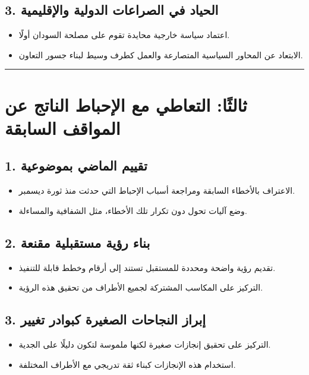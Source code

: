 \documentclass[12pt]{article}
\begin{document}
\subsection{3. الحياد في الصراعات الدولية والإقليمية}
\begin{itemize}
    \item اعتماد سياسة خارجية محايدة تقوم على مصلحة السودان أولًا.
    \item الابتعاد عن المحاور السياسية المتصارعة والعمل كطرف وسيط لبناء جسور التعاون.
\end{itemize}

\hrule

\section{ثالثًا: التعاطي مع الإحباط الناتج عن المواقف السابقة}
\subsection{1. تقييم الماضي بموضوعية}
\begin{itemize}
    \item الاعتراف بالأخطاء السابقة ومراجعة أسباب الإحباط التي حدثت منذ ثورة ديسمبر.
    \item وضع آليات تحول دون تكرار تلك الأخطاء، مثل الشفافية والمساءلة.
\end{itemize}

\subsection{2. بناء رؤية مستقبلية مقنعة}
\begin{itemize}
    \item تقديم رؤية واضحة ومحددة للمستقبل تستند إلى أرقام وخطط قابلة للتنفيذ.
    \item التركيز على المكاسب المشتركة لجميع الأطراف من تحقيق هذه الرؤية.
\end{itemize}

\subsection{3. إبراز النجاحات الصغيرة كبوادر تغيير}
\begin{itemize}
    \item التركيز على تحقيق إنجازات صغيرة لكنها ملموسة لتكون دليلًا على الجدية.
    \item استخدام هذه الإنجازات كبناء ثقة تدريجي مع الأطراف المختلفة.
\end{itemize}
\end{document}

